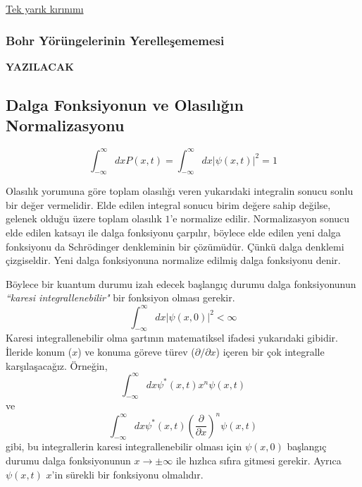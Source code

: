 \documentclass[a4paper,12pt, twoside]{article}
\newcommand{\YAZILACAK}{{\vspace{18pt}\bf\Large \color{red} YAZILACAK}}
\begin{document}
\href{https://opentextbc.ca/physicstestbook2/chapter/single-slit-diffraction/}{Tek yarık kırınımı}

\subsubsection{Bohr Yörüngelerinin Yerelleşememesi}
\YAZILACAK

\subsection{Dalga Fonksiyonun ve Olasılığın Normalizasyonu}

\begin{equation}
\int ^{\infty }_{-\infty }dxP\left( x,t\right) =\int ^{\infty }_{-\infty }dx\left| \psi \left( x,t\right) \right| ^{2}=1
\label{eq:probability_norm}
\end{equation}

Olasılık yorumuna göre toplam olasılığı veren yukarıdaki integralin  sonucu sonlu bir değer vermelidir.  Elde edilen integral sonucu birim değere sahip değilse, gelenek olduğu üzere toplam olasılık $1$'e normalize edilir.  Normalizasyon sonucu  elde edilen katsayı ile dalga fonksiyonu çarpılır, böylece elde edilen yeni dalga fonksiyonu da Schrödinger denkleminin bir çözümüdür. Çünkü dalga denklemi çizgiseldir. Yeni dalga fonksiyonuna normalize edilmiş dalga fonksiyonu denir.

Böylece bir kuantum durumu izah edecek başlangıç durumu dalga fonksiyonunun \emph{``karesi integrallenebilir"} bir fonksiyon olması gerekir. 
\begin{equation}
\int ^{\infty }_{-\infty }dx\left| \psi \left( x,0\right) \right| ^{2} < \infty
\label{eq:square_integrable}
\end{equation}
Karesi integrallenebilir olma şartının matematiksel ifadesi yukarıdaki gibidir. İleride konum ($x$) ve konuma göreve türev ($\partial/\partial x$) içeren bir çok integralle karşılaşacağız. Örneğin,
\begin{equation*}
\int ^{\infty }_{-\infty }dx \psi^* \left( x,t\right) x^n \psi \left( x,t\right) 
\end{equation*}
ve
\begin{equation*}
\int ^{\infty }_{-\infty }dx \psi^* \left( x,t\right) \left(\frac{\partial}{\partial x}\right)^n \psi \left( x,t\right) 
\end{equation*}
gibi, bu integrallerin karesi integrallenebilir olması için $\psi(x,0)$ başlangıç durumu dalga fonksiyonunun $x\rightarrow\pm\infty$ ile hızlıca sıfıra gitmesi gerekir. Ayrıca $\psi(x,t)$ $x$'in sürekli bir fonksiyonu olmalıdır.
\end{document}
